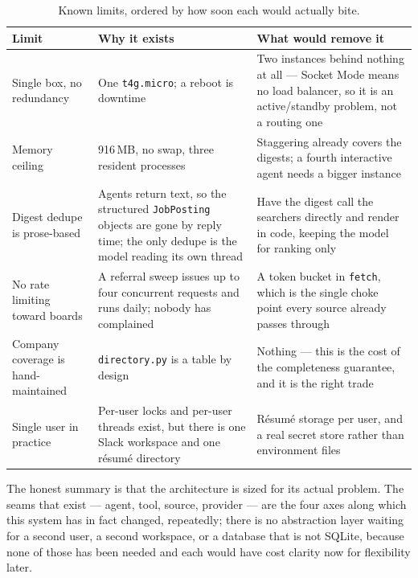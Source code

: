\documentclass[11pt,a4paper]{article}
\newcommand{\tablefont}{\footnotesize}
\begin{document}
\begin{table}[!ht]
\centering\tablefont
\caption{Known limits, ordered by how soon each would actually bite.}
\label{tab:limits}
\begin{tabularx}{\textwidth}{L{3.5cm} X L{4.2cm}}
\toprule
\textbf{Limit} & \textbf{Why it exists} & \textbf{What would remove it} \\
\midrule
Single box, no redundancy & One \texttt{t4g.micro}; a reboot is downtime & Two instances
  behind nothing at all --- Socket Mode means no load balancer, so it is an
  active/standby problem, not a routing one \\
Memory ceiling & 916\,MB, no swap, three resident processes & Staggering already covers the
  digests; a fourth interactive agent needs a bigger instance \\
Digest dedupe is prose-based & Agents return text, so the structured \texttt{JobPosting}
  objects are gone by reply time; the only dedupe is the model reading its own thread &
  Have the digest call the searchers directly and render in code, keeping the model for
  ranking only \\
No rate limiting toward boards & A referral sweep issues up to four concurrent requests and
  runs daily; nobody has complained & A token bucket in \texttt{fetch}, which is the single
  choke point every source already passes through \\
Company coverage is hand-maintained & \texttt{directory.py} is a table by design & Nothing
  --- this is the cost of the completeness guarantee, and it is the right trade \\
Single user in practice & Per-user locks and per-user threads exist, but there is one Slack
  workspace and one résumé directory & Résumé storage per user, and a real secret store
  rather than environment files \\
\bottomrule
\end{tabularx}
\end{table}

The honest summary is that the architecture is sized for its actual problem. The seams that
exist --- agent, tool, source, provider --- are the four axes along which this system has in
fact changed, repeatedly; there is no abstraction layer waiting for a second user, a second
workspace, or a database that is not SQLite, because none of those has been needed and each
would have cost clarity now for flexibility later.

\appendix
\end{document}

